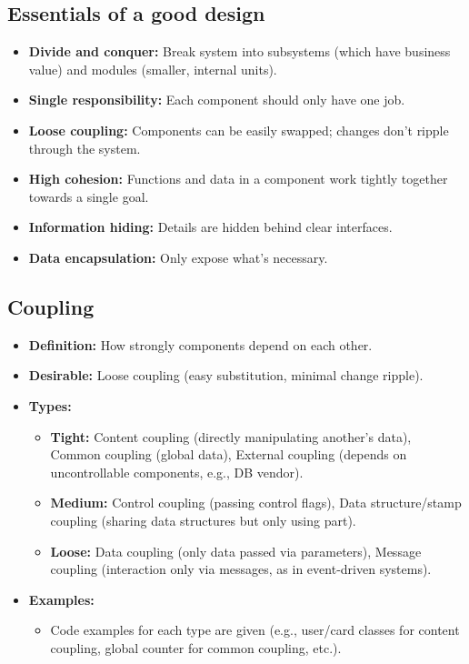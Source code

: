 \documentclass[11pt,a4paper]{article}
\begin{document}
\subsection*{Essentials of a good design}
\begin{itemize}
    \item \textbf{Divide and conquer:} Break system into subsystems (which have business value) and modules (smaller, internal units).
    \item \textbf{Single responsibility:} Each component should only have one job.
    \item \textbf{Loose coupling:} Components can be easily swapped; changes don't ripple through the system.
    \item \textbf{High cohesion:} Functions and data in a component work tightly together towards a single goal.
    \item \textbf{Information hiding:} Details are hidden behind clear interfaces.
    \item \textbf{Data encapsulation:} Only expose what's necessary.
\end{itemize}

\subsection*{Coupling}
\begin{itemize}
    \item \textbf{Definition:} How strongly components depend on each other.
    \item \textbf{Desirable:} Loose coupling (easy substitution, minimal change ripple).
    \item \textbf{Types:}
        \begin{itemize}
            \item \textbf{Tight:} Content coupling (directly manipulating another's data), Common coupling (global data), External coupling (depends on uncontrollable components, e.g., DB vendor).
            \item \textbf{Medium:} Control coupling (passing control flags), Data structure/stamp coupling (sharing data structures but only using part).
            \item \textbf{Loose:} Data coupling (only data passed via parameters), Message coupling (interaction only via messages, as in event-driven systems).
        \end{itemize}
    \item \textbf{Examples:}
        \begin{itemize}
            \item Code examples for each type are given (e.g., user/card classes for content coupling, global counter for common coupling, etc.).
        \end{itemize}
\end{itemize}
\end{document}
